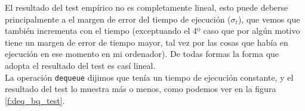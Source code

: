 \documentclass[a4paper, 12pt]{article}
\begin{document}
                El resultado del test empírico no es completamente lineal, esto 
                puede deberse principalmente a el margen de error del tiempo de 
                ejecución ($\sigma_t$), que vemos que también incrementa con el 
                tiempo (exceptuando el 4º caso que por algún motivo tiene un
                margen de error de tiempo mayor, tal vez por las cosas que había
                en ejecución en ese momento en mi ordenador). De todas formas la 
                forma que adopta el resultado del test es casí lineal.
                \\\mbox{}
                La operación \texttt{dequeue} dijimos que tenía un tiempo de 
                ejecución constante, y el resultado del test lo muestra más o 
                menos, como podemos ver en la figura 
                \ref{f:deq_bq_test}.\\\mbox{}
\end{document}

